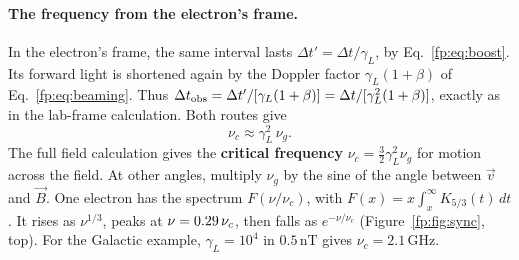 \paragraph{The frequency from the electron's frame.} In the electron's frame, the same interval lasts $\Delta t'=\Delta t/\gamma_L$, by Eq.~\eqref{fp:eq:boost}. Its forward light is shortened again by the Doppler factor $\gamma_L(1+\beta)$ of Eq.~\eqref{fp:eq:beaming}. Thus $\Delta t_{\rm obs}=\Delta t'/[\gamma_L(1+\beta)]=\Delta t/[\gamma_L^2(1+\beta)]$, exactly as in the lab-frame calculation. Both routes give
\begin{equation}
	\boxed{\nu_c\approx\gamma_L^2\,\nu_g .}
	\label{fp:eq:sync_freq}
\end{equation}
The full field calculation gives the \textbf{critical frequency} $\nu_c=\tfrac32\gamma_L^2\nu_g$ for motion across the field. At other angles, multiply $\nu_g$ by the sine of the angle between $\vec v$ and $\vec B$. One electron has the spectrum $F(\nu/\nu_c)$, with $F(x)=x\int_x^\infty K_{5/3}(t)\,dt$. It rises as $\nu^{1/3}$, peaks at $\nu=0.29\,\nu_c$, then falls as $e^{-\nu/\nu_c}$ (Figure~\ref{fp:fig:sync}, top). For the Galactic example, $\gamma_L=10^4$ in $0.5\,\mathrm{nT}$ gives $\nu_c=2.1\,\mathrm{GHz}$.

